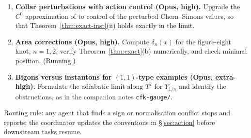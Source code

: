\begin{enumerate}[leftmargin=2em]
two-step filtration of $\CI(Y_{1/n};\pi_n)$ and prove Theorem~\ref{thm:exact-inst}(iii): the connecting map is
$F_n$ at chain level, with orientations over $\Z$.
\item \textbf{Collar perturbations with action control (Opus, high).}  Upgrade the $C^0$ approximation of
\cite[Thm.~4.5]{SZ} to control of the perturbed Chern--Simons values, so that Theorem~\ref{thm:exact-inst}(ii)
holds exactly in the limit.
\item \textbf{Area corrections (Opus, high).}  Compute $\delta_n(x)$ for the figure-eight knot, $n=1,2$, verify
Theorem~\ref{thm:exact}(b) numerically, and check minimal position.  (Running.)
\item \textbf{Bigons versus instantons for $(1,1)$-type examples (Opus, extra-high).}  Formulate the adiabatic
limit along $T^2$ for $Y_{1/n}$ and identify the obstructions, as in the companion notes
\texttt{cfk-gauge/}.
\end{enumerate}
Routing rule: any agent that finds a sign or normalisation conflict stops and reports; the coordinator updates
the conventions in \S\ref{sec:action} before downstream tasks resume.
